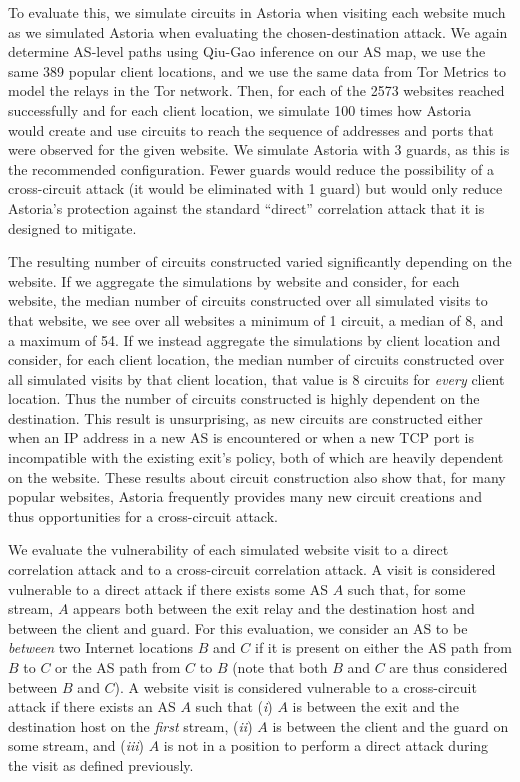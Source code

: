 \documentclass[conference]{styles/IEEEtran}
\begin{document}
To evaluate this, we simulate circuits in Astoria when visiting each website much
as we simulated Astoria when evaluating the chosen-destination attack. We again determine AS-level
paths using Qiu-Gao inference on our AS map, we use the same 389 popular client locations, and we
use the same data from Tor Metrics to model the relays in the Tor network. Then,
for each of the 2573 websites reached successfully and for each client location, we simulate
100 times how Astoria would create and use circuits to reach the sequence of addresses and ports
that were observed for the given website. We simulate Astoria with 3 guards, as this is the
recommended configuration. Fewer guards would reduce the possibility of a cross-circuit attack
(it would be eliminated with 1 guard) but would only reduce Astoria's protection against the
standard ``direct'' correlation attack that it is designed to mitigate.

The resulting number of circuits constructed varied significantly depending on the website.
If we aggregate the simulations by website and consider, for each
website, the median number of circuits constructed over all simulated visits to that website, we see
over all websites a minimum of 1 circuit, a median of 8, and a maximum of 54. If we instead
aggregate the simulations by client location and consider, for each client location, the median
number of circuits
constructed over all simulated visits by that client location, that value is 8 circuits for
\emph{every} client location. Thus the number of circuits constructed is highly dependent on the
destination. This result is unsurprising, as new circuits are constructed either when an IP address
in a new AS is encountered or when a new TCP port is incompatible with the existing exit's policy,
both of which are heavily dependent on the website. These results about circuit construction also
show that, for many popular websites, Astoria frequently provides many new circuit creations and
thus opportunities for a cross-circuit attack.

We evaluate the vulnerability of each simulated website visit to a direct correlation attack and to
a cross-circuit correlation attack. A visit is considered vulnerable to a direct attack
if there exists some AS $A$ such that, for some stream, $A$ appears both between the exit relay and
the destination host and between the client and guard. For this evaluation, we consider an AS to be
\emph{between} two Internet locations $B$ and $C$ if it is present on either the AS path from $B$ to
$C$ or the AS path from $C$ to $B$ (note that both $B$ and $C$ are thus considered between $B$ and
$C$). A website visit is considered vulnerable to a cross-circuit attack if there exists an AS $A$
such that (\emph{i}) $A$ is between the exit and the destination host on the \emph{first} stream,
(\emph{ii}) $A$ is between the client and the guard on some stream, and (\emph{iii}) $A$ is not
in a position to perform a direct attack during the visit as defined previously.
\end{document}
